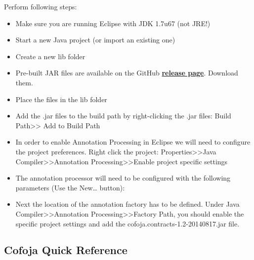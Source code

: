 \documentclass{article}
\begin{document}
 Perform following steps:
 \begin{itemize}
\item Make sure you are running Eclipse with JDK 1.7u67 (not JRE!)
\item Start a new Java project (or import an existing one)
\item Create a new lib folder 
\item Pre-built JAR files are available on the GitHub
\href{https://github.com/nhatminhle/cofoja/releases}{\textbf{release
    page}}. Download them.
\item Place the files in the lib folder
\item Add the .jar files to the build path by right-clicking the .jar
  files: Build Path>> Add to Build Path
\item In order to enable Annotation Processing in Eclipse we will 
need to configure the project preferences. Right click the project: 
Properties>>Java Compiler>>Annotation Processing>>Enable 
project specific settings
\item The annotation processor will need to be configured with 
the following parameters (Use the New… button):
\item Next the location of the annotation factory has to be defined. Under Java 
Compiler>>Annotation Processing>>Factory Path, you should enable the specific project 
settings and add the cofoja.contracts-1.2-20140817.jar file. 

 \end{itemize}

\subsection{Cofoja Quick Reference}
\end{document}
